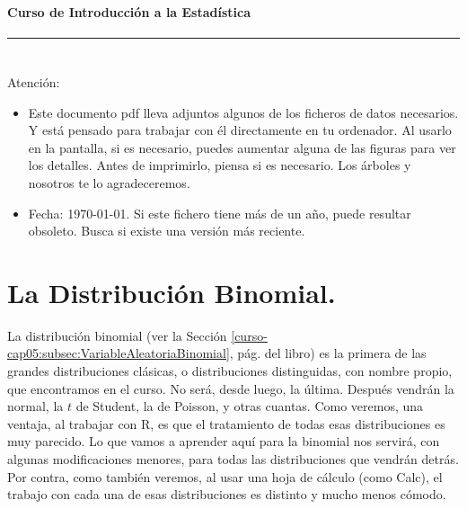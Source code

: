 \documentclass[10pt,a4paper]{article}\usepackage[]{graphicx}\usepackage[]{color}
\newcounter{cont01}
\begin{document}




\paragraph{\hspace{6.3cm}Curso de Introducción a la Estadística\\[2mm]} \noindent\hrule

\setcounter{section}{0}
\section*{\hspace{-0.1cm}}
{
Atención:
\begin{itemize}
  \item Este documento pdf lleva adjuntos algunos de los ficheros de datos necesarios. Y está pensado para trabajar con él directamente en tu ordenador. Al usarlo en la pantalla, si es necesario, puedes aumentar alguna de las figuras para ver los detalles. Antes de imprimirlo, piensa si es necesario. Los árboles y nosotros te lo agradeceremos.
  \item Fecha: \today. Si este fichero tiene más de un año, puede resultar obsoleto. Busca si existe una versión más reciente.
\end{itemize}
}
\setcounter{tocdepth}{1}
\tableofcontents


\section{La Distribución Binomial.}
\label{tut05:sec:DistribucionBinomial}

La distribución binomial (ver la Sección \ref{curso-cap05:subsec:VariableAleatoriaBinomial}, pág. \pageref{curso-cap05:subsec:VariableAleatoriaBinomial} del libro) es la primera de las grandes distribuciones clásicas, o distribuciones distinguidas, con nombre propio, que encontramos en el curso. No será, desde luego, la última. Después vendrán la normal, la $t$ de Student, la de Poisson, y otras cuantas. Como veremos, una ventaja, al trabajar con R, es que el tratamiento de todas esas distribuciones es muy parecido. Lo que vamos a aprender aquí para la  binomial nos servirá, con algunas modificaciones menores, para todas las distribuciones que vendrán detrás. Por contra, como también veremos, al usar una hoja de cálculo (como Calc), el trabajo con cada una de esas distribuciones es distinto y mucho menos cómodo.
\end{document}
